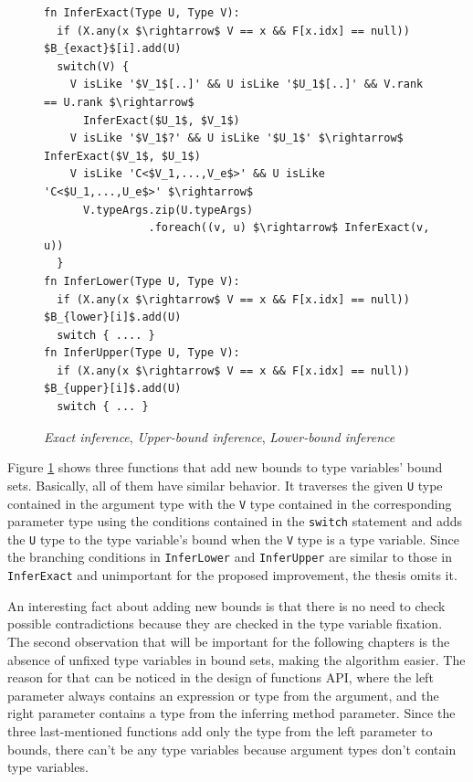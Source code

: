 \begin{figure}[h!]
\begin{lstlisting}[style=myAlgo, mathescape=true]
fn InferExact(Type U, Type V):
  if (X.any(x $\rightarrow$ V == x && F[x.idx] == null)) $B_{exact}$[i].add(U)
  switch(V) {
    V isLike '$V_1$[..]' && U isLike '$U_1$[..]' && V.rank == U.rank $\rightarrow$ 
      InferExact($U_1$, $V_1$)
    V isLike '$V_1$?' && U isLike '$U_1$' $\rightarrow$ InferExact($V_1$, $U_1$)
    V isLike 'C<$V_1,...,V_e$>' && U isLike 'C<$U_1,...,U_e$>' $\rightarrow$
      V.typeArgs.zip(U.typeArgs)
                .foreach((v, u) $\rightarrow$ InferExact(v, u)) 
  }
fn InferLower(Type U, Type V):
  if (X.any(x $\rightarrow$ V == x && F[x.idx] == null)) $B_{lower}[i]$.add(U)
  switch { .... }
fn InferUpper(Type U, Type V):
  if (X.any(x $\rightarrow$ V == x && F[x.idx] == null)) $B_{upper}[i]$.add(U)
  switch { ... }
\end{lstlisting}
\caption{\textit{Exact inference}, \textit{Upper-bound inference}, \textit{Lower-bound inference}}
\label{img12:methodTypeInference3}
\end{figure}
Figure \ref{img12:methodTypeInference3} shows three functions that add new bounds to type variables’
bound sets. 
Basically, all of them have similar behavior. 
It traverses the given \texttt{U} type contained in the argument type with the \texttt{V} type contained in the corresponding parameter type using the conditions contained in the \texttt{switch} statement and adds the \texttt{U} type to the type variable’s bound when the \texttt{V} type is a type variable. 
Since the branching conditions in \texttt{InferLower} and \texttt{InferUpper} are similar to those in \texttt{InferExact} and unimportant for the proposed improvement, the thesis omits it.
\par
An interesting fact about adding new bounds is that there is no need to check possible contradictions because they are checked in the type variable fixation. 
The second observation that will be important for the following chapters is the absence of unfixed type variables in bound sets, making the algorithm easier. 
The reason for that can be noticed in the design of functions API, where the left parameter always contains an expression or type from the argument, and the right parameter contains a type from the inferring method parameter. 
Since the three last-mentioned functions add only the type from the left parameter to bounds, there can’t be any type variables because argument types don’t contain type variables.
\par
